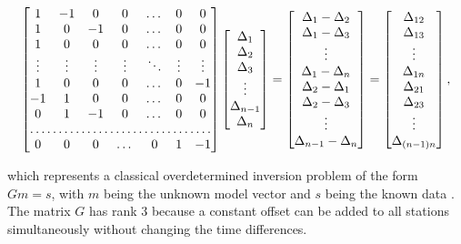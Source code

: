 \documentclass[12pt,a4paper,english]{article}
\begin{document}
\begin{equation*}
\begin{bmatrix}
1 & -1 & 0 & 0 & \dots & 0 & 0 \\
1 & 0 & -1 & 0 & \dots & 0 & 0 \\
1 &  0  & 0 & 0 & \dots & 0  & 0 \\
\vdots & \vdots & \vdots & \vdots & \ddots & \vdots & \vdots \\
1 &  0  & 0 & 0 & \dots & 0 & -1 \\
-1 & 1 & 0 & 0 & \dots & 0  & 0 \\
0 & 1 & -1 & 0 & \dots & 0 & 0 \\
\hdotsfor{7} \\
0 & 0 & 0 & \dots & 0& 1 & -1
\end{bmatrix}
 \begin{bmatrix}
\Delta_1 \\ \Delta_2 \\ \Delta_3 \\ \vdots \\ \Delta_{n-1} \\ \Delta_n
\end{bmatrix}
 = 
 \begin{bmatrix}
 \Delta_1 - \Delta_2 \\ \Delta_1-\Delta_3 \\ \vdots \\ \Delta_1 - \Delta_{n} \\ \Delta_2- \Delta_1 \\ \Delta_2 - \Delta_3 \\ \vdots \\ \Delta_{n-1} - \Delta_n
 \end{bmatrix}
= 
\begin{bmatrix}
\Delta_{12} \\ \Delta_{13} \\ \vdots \\ \Delta_{1n} \\ \Delta_{21} \\ \Delta_{23} \\ \vdots \\ \Delta_{(n-1)n}
\end{bmatrix}, 
\end{equation*}

which represents a classical overdetermined inversion problem of the form $Gm = s$, with $m$ being the unknown model vector and $s$ being the known data \cite{sens2008}. The matrix $G$ has rank 3 because a constant offset can be added to all stations simultaneously without changing the time differences. 
\end{document}
